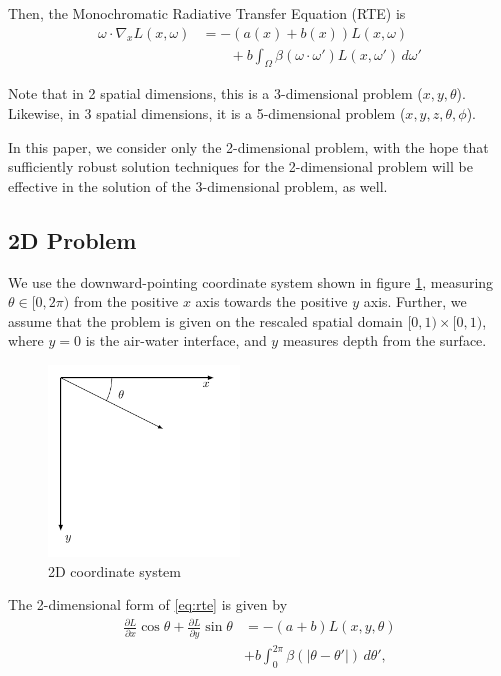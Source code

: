 \documentclass[10pt]{article}
\newcommand\abs[1]{\left| #1 \right|}
\newcommand\pd[2]{\frac{\partial #1}{\partial #2}}
\begin{document}
\begin{multicols}{2}
Then, the Monochromatic Radiative Transfer Equation (RTE) is
\begin{equation}
	\tag{RTE}
	\label{eq:rte}
	\begin{aligned}
		\omega \cdot \nabla_x L(x,\omega) &= -(a(x) + b(x)) L(x,\omega) \\
		&\qquad + b \int_\Omega \beta(\omega \cdot \omega') L(x,\omega')\, d\omega'
	\end{aligned}
\end{equation}

Note that in 2 spatial dimensions, this is a 3-dimensional problem ($x,y,\theta$).
Likewise, in 3 spatial dimensions, it is a 5-dimensional problem ($x,y,z,\theta,\phi$).

In this paper, we consider only the 2-dimensional problem, with the hope that sufficiently robust solution techniques for the 2-dimensional problem will be effective in the solution of the 3-dimensional problem, as well.

\subsection{2D Problem}
\label{sec:2d}
We use the downward-pointing coordinate system shown in figure \ref{fig:coords}, measuring $\theta \in [0,2\pi)$ from the positive $x$ axis towards the positive $y$ axis.
Further, we assume that the problem is given on the rescaled spatial domain $[0,1) \times [0,1)$, where $y=0$ is the air-water interface, and $y$ measures depth from the surface.

\begin{figure}[H]
	\centering
	\includegraphics[width=2in]{2d_coords}
	\caption{2D coordinate system}
	\label{fig:coords}
\end{figure}

The 2-dimensional form of \eqref{eq:rte} is given by
\begin{equation}
	\begin{aligned}
		\pd{L}{x} \cos\theta + \pd{L}{y} \sin\theta
		&= -(a+b)L(x,y,\theta) \\
		&+ b\int_0^{2\pi} \beta(\abs{\theta-\theta'})\,d\theta',
	\end{aligned}
	\label{eq:rte2d}
\end{equation}


\end{multicols}
\end{document}
